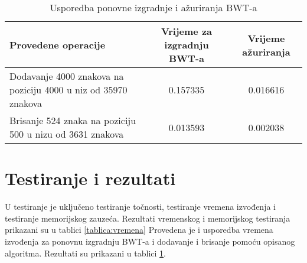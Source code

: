 \documentclass{ferseminar}
\begin{document}
\begin{table}[h]
\begin{tabular}{|m{5cm}|c|c|}
	\hline
	Provedene operacije & Vrijeme za izgradnju BWT-a & Vrijeme ažuriranja \\
	\hline
	Dodavanje 4000 znakova na poziciju 4000 u niz od 35970 znakova & 0.157335 & 0.016616 \\
	\hline
	Brisanje 524 znaka na poziciju 500 u nizu od 3631 znakova & 0.013593 & 0.002038 \\
	\hline
\end{tabular}
\caption{Usporedba ponovne izgradnje i ažuriranja BWT-a}
\label{tablica:usporedba}
\end{table}

\section{Testiranje i rezultati}
U testiranje je uključeno testiranje točnosti, testiranje vremena izvođenja i testiranje memorijskog zauzeća. Rezultati vremenskog i memorijskog testiranja prikazani su u tablici \ref{tablica:vremena} Provedena je i usporedba vremena izvođenja za ponovnu izgradnju BWT-a i dodavanje i brisanje pomoću opisanog algoritma. Rezultati su prikazani u tablici \ref{tablica:usporedba}.
\end{document}
